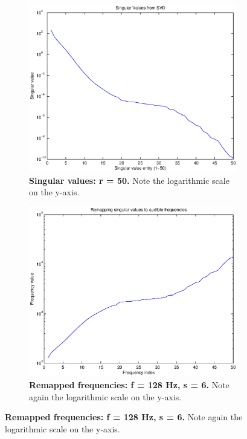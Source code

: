 \documentclass[11pt]{article}
\begin{document}
\begin{figure}
	\begin{subfigure}[h]{0.5\textwidth}
		\includegraphics[width=\textwidth]{figures/singulars.eps}
		\caption{\textbf{Singular values: r = 50.} Note the logarithmic scale on the y-axis.}
		\label{fig:singulars}
	\end{subfigure}
	\begin{subfigure}[h]{0.5\textwidth}
		\includegraphics[width=\textwidth]{figures/remap_freqs.eps}
		\caption{\textbf{Remapped frequencies: f = 128 Hz, s = 6.} Note again the logarithmic scale on the y-axis.}
		\label{fig:freqs}
	\end{subfigure}
\end{figure}
\end{document}
